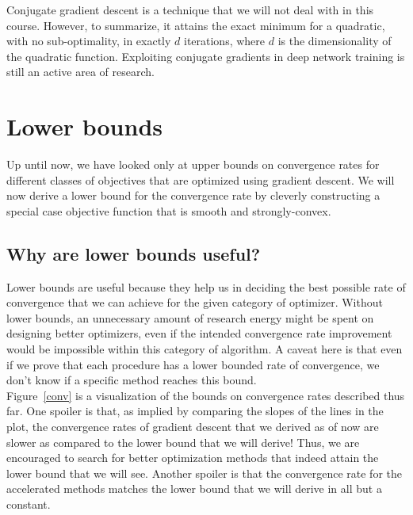 \documentclass{article}
\begin{document}
Conjugate gradient descent is a technique that we will not deal with in this course. 
However, to summarize, it attains the exact minimum for a quadratic, with no sub-optimality, in exactly $d$ iterations, where $d$ is the dimensionality of the quadratic function. 
Exploiting conjugate gradients in deep network training is still an active area of research.


\newcommand{\supff}{\sup_{f \in \mathcal{F}}}

\section{Lower bounds}

Up until now, we have looked only at upper bounds on convergence rates for different classes of objectives that are optimized using gradient descent. 
We will now derive a lower bound for the convergence rate by cleverly constructing a special case objective function that is smooth and strongly-convex.

\subsection{Why are lower bounds useful?}
Lower bounds are useful because they help us in deciding the best possible rate of convergence that we can achieve for the given category of optimizer.
Without lower bounds, an unnecessary amount of research energy might be spent on designing better optimizers, even if the intended convergence rate improvement would be impossible within this category of algorithm. 
A caveat here is that even if we prove that each procedure has a lower bounded rate of convergence, we don't know if a specific method reaches this bound.\\

Figure~\ref{conv} is a visualization of the bounds on convergence rates described thus far. 
One spoiler is that, as implied by comparing the slopes of the lines in the plot, the convergence rates of gradient descent that we derived as of now are slower as compared to the lower bound that we will derive! 
Thus, we are encouraged to search for better optimization methods that indeed attain the lower bound that we will see.
Another spoiler is that the convergence rate for the accelerated methods matches the lower bound that we will derive in all but a constant. 
\end{document}

